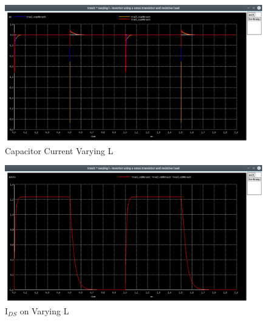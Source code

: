 \documentclass[12pt, a4paper]{article}
\begin{document}
	\begin{figure}[H]
		\begin{center}
			\includegraphics[scale=0.25]{images/inverter_l_vcap.png}
			\caption{Capacitor Current Varying L}
			\label{fig::varying_l_vcap}
		\end{center}
	\end{figure}
	\begin{figure}[H]
		\begin{center}
			\includegraphics[scale=0.25]{images/inverter_l_vdd.png}
			\caption{$\text{I}_{DS}$ on Varying L}
			\label{fig::varying_l_vdd}
		\end{center}
	\end{figure}
	
\end{document}
